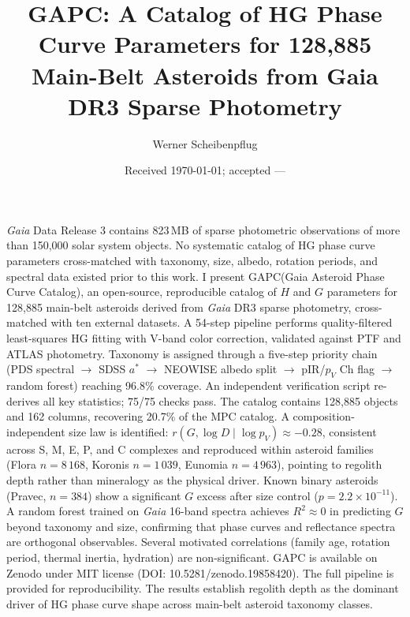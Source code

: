 \documentclass{aa}
\providecommand{\orcid}[1]{}
\newcommand{\gapc}{GAPC\xspace}
\newcommand{\gaia}{{\it Gaia}\xspace}
\begin{document}
\title{GAPC: A Catalog of HG Phase Curve Parameters for 128,885 Main-Belt
       Asteroids from Gaia DR3 Sparse Photometry}


\author{Werner Scheibenpflug\orcid{0009-0008-6450-479X}}


\date{Received \today; accepted ---}

\abstract
{
  \gaia Data Release 3 contains 823\,MB of sparse photometric observations
  of more than 150,000 solar system objects.  No systematic catalog of
  HG phase curve parameters cross-matched with taxonomy, size, albedo,
  rotation periods, and spectral data existed prior to this work.
}{
  I present \gapc (Gaia Asteroid Phase Curve Catalog), an open-source,
  reproducible catalog of $H$ and $G$ parameters for 128,885 main-belt
  asteroids derived from \gaia DR3 sparse photometry, cross-matched with
  ten external datasets.
}{
  A 54-step pipeline performs quality-filtered least-squares HG fitting
  with V-band color correction, validated against PTF and ATLAS photometry.
  Taxonomy is assigned through a five-step priority chain (PDS spectral
  $\to$ SDSS $a^*$ $\to$ NEOWISE albedo split $\to$ pIR/$p_V$ Ch flag
  $\to$ random forest) reaching 96.8\% coverage.  An independent
  verification script re-derives all key statistics; 75/75 checks pass.
}{
  The catalog contains 128,885 objects and 162 columns, recovering 20.7\%
  of the MPC catalog.  A composition-independent size law is identified:
  $r(G,\log D \mid \log p_V) \approx -0.28$, consistent across S, M, E,
  P, and C complexes and reproduced within asteroid families (Flora
  $n=8\,168$, Koronis $n=1\,039$, Eunomia $n=4\,963$), pointing to
  regolith depth rather than mineralogy as the physical driver.  Known
  binary asteroids (Pravec, $n=384$) show a significant $G$ excess after
  size control ($p = 2.2 \times 10^{-11}$).  A random forest trained on
  \gaia 16-band spectra achieves $R^2 \approx 0$ in predicting $G$ beyond
  taxonomy and size, confirming that phase curves and reflectance spectra
  are orthogonal observables.  Several motivated correlations (family age,
  rotation period, thermal inertia, hydration) are non-significant.
}{
  \gapc is available on Zenodo under MIT license
  (DOI: 10.5281/zenodo.19858420).  The full pipeline is provided for
  reproducibility.  The results establish regolith depth as the dominant
  driver of HG phase curve shape across main-belt asteroid taxonomy classes.
}
\end{document}
